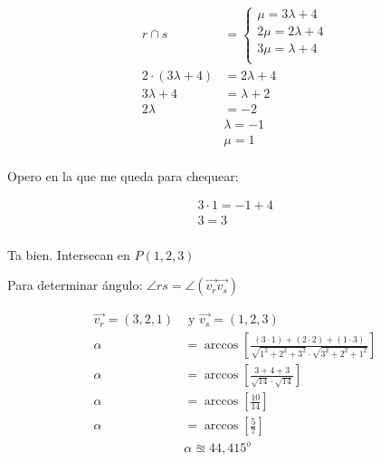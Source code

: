 \documentclass{article}
\begin{document}
\begin{align*}
    r \cap s                & =
    \begin{cases}
        \mu = 3 \lambda + 4   \\
        2 \mu = 2 \lambda + 4 \\
        3 \mu = \lambda + 4   \\
    \end{cases}                          \\
    2 \cdot (3 \lambda + 4) & = 2 \lambda + 4      \\
    3 \lambda + 4           & = \lambda + 2        \\
    2 \lambda               & = -2                 \\
                            & \boxed{\lambda = -1} \\
                            & \boxed{\mu = 1}      \\
\end{align*}

Opero en la que me queda para chequear:

\begin{align*}
    3 \cdot 1 = -1 + 4 \\
    \boxed{3 = 3}      \\
\end{align*}

Ta bien. Intersecan en \(P (1,2,3)\)

Para determinar ángulo: \(\angle rs = \angle(\vec{v_r}\vec{v_s})\)

\begin{align*}
    \vec{v_r} = (3,2,1) & \text{  y  } \vec{v_s} = (1,2,3)                                                                                           \\
    \alpha              & = \arccos \left[\frac{(3 \cdot 1)+(2 \cdot 2)+(1 \cdot 3)}{\sqrt{1^{2}+2^{2}+3^{2}} \cdot \sqrt{3^{2}+2^{2}+1^{2}}}\right] \\
    \alpha              & = \arccos \left[\frac{3+4+3}{\sqrt{14} \cdot \sqrt{14}}\right]                                                             \\
    \alpha              & = \arccos \left[\frac{10}{14}\right]                                                                                       \\
    \alpha              & = \arccos \left[\frac{5}{7}\right]                                                                                         \\
                        & \boxed{\alpha \approxeq 44,415^o}
\end{align*}
\end{document}
